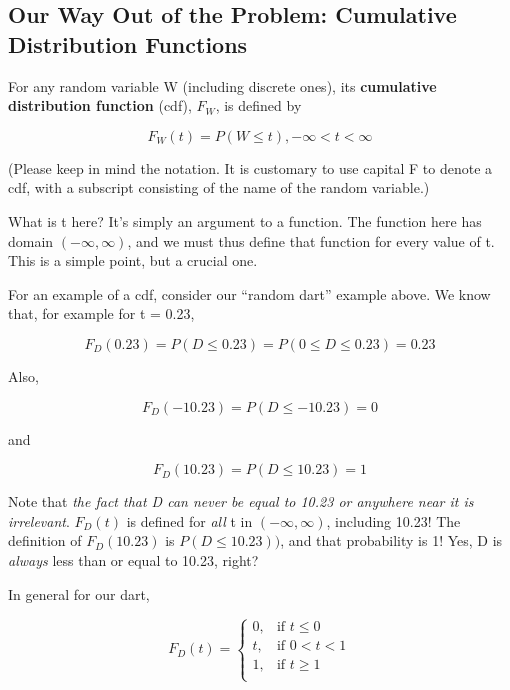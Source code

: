 \subsection{Our Way Out of the Problem:  Cumulative Distribution Functions}
\label{cdfdef}

\begin{definition}
For any random variable W (including discrete ones),
its {\bf cumulative distribution function} (cdf), $F_W$, is defined by

\begin{equation}
\label{cdf}
F_W(t) = P(W \leq t), -\infty < t < \infty
\end{equation}
\end{definition}

(Please keep in mind the notation.  It is customary to use capital F to
denote a cdf, with a subscript consisting of the name of the random
variable.)

What is t here?  It's simply an argument to a function.  The function
here has domain $(-\infty, \infty)$, and we must thus define that
function for every value of t.  This is a simple point, but a crucial
one.

For an example of a cdf, consider our ``random dart'' example above.  We
know that, for example for t = 0.23,

\begin{equation}
F_D(0.23) = P(D \leq 0.23) = P(0 \leq D \leq 0.23) = 0.23
\end{equation}

Also, 

\begin{equation}
F_D(-10.23) = P(D \leq -10.23) = 0
\end{equation}

and

\begin{equation}
F_D(10.23) = P(D \leq 10.23) = 1
\end{equation}

Note that {\it the fact that D can never be equal to 10.23 or anywhere
near it is irrelevant}.  $F_D(t)$ is defined for {\it all} t in
$(-\infty,\infty)$, including 10.23!  The definition of $F_D(10.23)$ is
$P(D \leq 10.23))$, and that probability is 1!  Yes, D is {\it always}
less than or equal to 10.23, right?

In general for our dart,

\begin{equation}
\label{unifcdf}
F_D(t) = 
\begin{cases}
0, & \text{if $t \leq 0$} \\
t, & \text{if $0 < t < 1$} \\ 
1, & \text{if $t \geq 1$} \\
\end{cases}
\end{equation}

